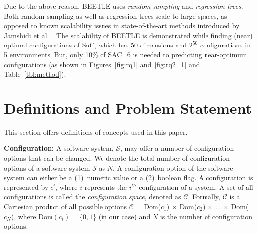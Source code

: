 \documentclass[10pt,journal,compsoc]{IEEEtran}
\begin{document}
 Due to the above reason, BEETLE uses \textit{random sampling} and \textit{regression trees}. Both random sampling as well as regression trees scale to large spaces, as opposed to known scalability issues in state-of-the-art methods introduced by Jamshidi et al.~\cite{jamshidi2017transfer, jamshidi2017transfer2}.  The scalability of BEETLE is demonstrated while finding (near) optimal configurations of SaC, which  has 50 dimensions and $2^{50}$ configurations in 5 environments. But, only 10\% of SAC\_6 is needed to predicting near-optimum configurations (as shown in Figures~\ref{fig:rq1} and~\ref{fig:rq2_1} and Table~\ref{tbl:method}). 






\section{Definitions and Problem Statement}
\label{sect:formalization}
\noindent This  section offers definitions of concepts
 used in this paper. 
 
\noindent\textbf{Configuration: }A software system, $\mathcal{S}$, may offer a number of configuration options that can be changed. We denote the total number of configuration options of a software system $\mathcal{S}$  as $N$. A configuration option of the software system can either be a (1)~numeric value or a (2)~boolean flag. A configuration is represented by $c^{i}$, where $i$ represents the $i^{th}$ configuration of a system. A set of all configurations is called the \textit{configuration space}, denoted as $\mathcal{C}$.
  Formally, $\mathcal{C}$ is a Cartesian product of all possible options $\mathcal{C}$ = Dom($c_1$) $\times$ Dom($c_2$) $\times$ ... $\times$ Dom($c_N$), where $\text{Dom}(c_i) = \{0, 1\}$ (in our case) and $N$ is the number of configuration options. 
\end{document}
